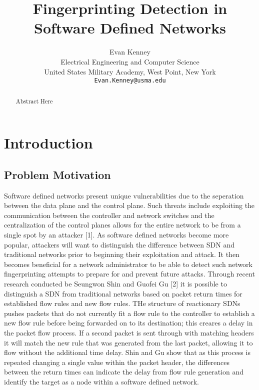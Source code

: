 \documentclass[twocolumn]{article}
\begin{document}
\title{Fingerprinting Detection in Software Defined Networks}
\author{Evan Kenney\\
	Electrical Engineering and Computer Science\\
	United States Military Academy, West Point, New York\\
	\texttt{Evan.Kenney@usma.edu}}
\maketitle

\begin{abstract}

Abstract Here

\end{abstract}

\section{Introduction}
\subsection{Problem Motivation}

Software defined networks present unique vulnerabilities due to the seperation between the data plane and the control plane. Such threats include exploiting the communication between the controller and network switches and the centralization of the control planes allows for the entire network to be from a single spot by an attacker [1]. As software defined networks become more popular, attackers will want to distinguish the difference between SDN and traditional networks prior to beginning their exploitation and attack. It then becomes beneficial for a network administrator to be able to detect such network fingerprinting attempts to prepare for and prevent future attacks. Through recent research conducted be Seungwon Shin and Guofei Gu [2] it is possible to distinguish a SDN from traditional networks based on packet return times for established flow rules and new flow rules. THe structure of reactionary SDNs pushes packets that do not currently fit a flow rule to the controller to establish a new flow rule before being forwarded on to its destination; this creares a delay in the packet flow process. If a second packet is sent through with matching headers it will match the new rule that was generated from the last packet, allowing it to flow without the additional time delay. Shin and Gu show that as this process is repeated changing a single value within the packet header, the differences between the return times can indicate the delay from flow rule generation and identify the target as a node within a software defined network.
\end{document}
